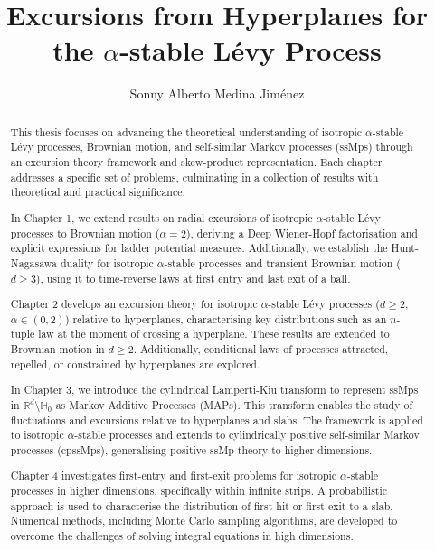\documentclass[11pt, twoside]{report}
\title{Excursions from Hyperplanes for the $\alpha$-stable Lévy Process}
\author{Sonny Alberto Medina Jiménez}
\begin{document}
\maketitle


\begin{abstract}
This thesis focuses on advancing the theoretical understanding of isotropic $\alpha$-stable Lévy processes, Brownian motion, and self-similar Markov processes (ssMps) through an excursion theory framework and skew-product representation. Each chapter addresses a specific set of problems, culminating in a collection of results with theoretical and practical significance.

In Chapter 1, we extend results on radial excursions of isotropic $\alpha$-stable Lévy processes to Brownian motion ($\alpha = 2$), deriving a Deep Wiener-Hopf factorisation and explicit expressions for ladder potential measures. Additionally, we establish the Hunt-Nagasawa duality for isotropic $\alpha$-stable processes and transient Brownian motion ($d \geq 3$), using it to time-reverse laws at first entry and last exit of a ball.

Chapter 2 develops an excursion theory for isotropic $\alpha$-stable Lévy processes ($d \geq 2$, $\alpha \in (0,2)$) relative to hyperplanes, characterising key distributions such as an $n$-tuple law at the moment of crossing a hyperplane. These results are extended to Brownian motion in $d \geq 2$. Additionally, conditional laws of processes attracted, repelled, or constrained by hyperplanes are explored.

In Chapter 3, we introduce the cylindrical Lamperti-Kiu transform to represent ssMps in $\mathbb{R}^d \setminus \mathbb{H}_0$ as Markov Additive Processes (MAPs). This transform enables the study of fluctuations and excursions relative to hyperplanes and slabs. The framework is applied to isotropic $\alpha$-stable processes and extends to cylindrically positive self-similar Markov processes (cpssMps), generalising positive ssMp theory to higher dimensions.

Chapter 4 investigates first-entry and first-exit problems for isotropic $\alpha$-stable processes in higher dimensions, specifically within infinite strips. A probabilistic approach is used to characterise the distribution of first hit or first exit to a slab. Numerical methods, including Monte Carlo sampling algorithms, are developed to overcome the challenges of solving integral equations in high dimensions.
\end{abstract}
\end{document}
